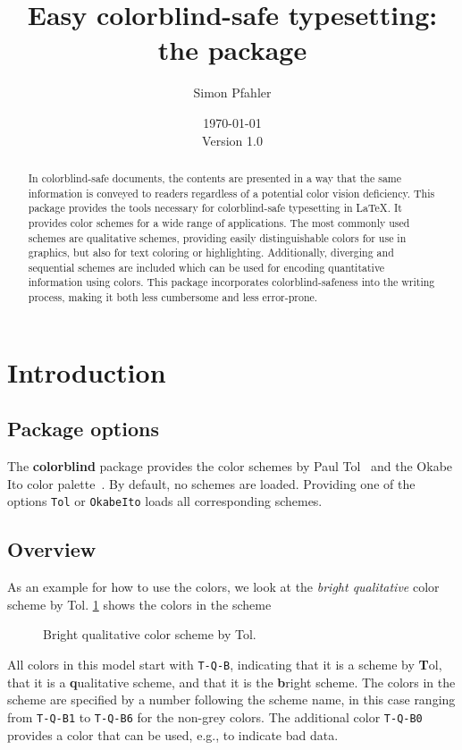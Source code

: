 \documentclass{scrartcl}
\title{Easy colorblind-safe typesetting:\\ the \colorblind package}
\author{Simon Pfahler}
\date{\today\\Version 1.0}
\newcommand\colorblind{\textbf{colorblind} }
\newcommand\marg[1]{\leavevmode\marginpar{\raggedleft #1}}
\begin{document}
\maketitle

\begin{abstract}
    In colorblind-safe documents, the contents are presented in a way that the same information is conveyed to readers regardless of a potential color vision deficiency.
    This package provides the tools necessary for colorblind-safe typesetting in \LaTeX.
    It provides color schemes for a wide range of applications.
    The most commonly used schemes are qualitative schemes, providing easily distinguishable colors for use in graphics, but also for text coloring or highlighting.
    Additionally, diverging and sequential schemes are included which can be used for encoding quantitative information using colors.
    This package incorporates colorblind-safeness into the writing process, making it both less cumbersome and less error-prone.
\end{abstract}

\tableofcontents
\clearpage

\section{Introduction}
\subsection{Package options}
\cprotect\marg{\verb!Tol!\\\verb!OkabeIto!}%
The \colorblind package provides the color schemes by Paul Tol~\cite{Tol} and the Okabe Ito color palette~\cite{Ichihara_2008}.
By default, no schemes are loaded.
Providing one of the options \verb!Tol! or \verb!OkabeIto! loads all corresponding schemes.

\subsection{Overview}
As an example for how to use the colors, we look at the \emph{bright qualitative} color scheme by Tol.
\cref{fig:T-Q-Bexample} shows the colors in the scheme

\begin{figure}[ht]
    \centering
    \caption{Bright qualitative color scheme by Tol.}
    \label{fig:T-Q-Bexample}
\end{figure}

All colors in this model start with \verb!T-Q-B!, indicating that it is a scheme by \textbf{T}ol, that it is a \textbf{q}ualitative scheme, and that it is the \textbf{b}right scheme.
The colors in the scheme are specified by a number following the scheme name, in this case ranging from \verb!T-Q-B1! to \verb!T-Q-B6! for the non-grey colors.
The additional color \verb!T-Q-B0! provides a color that can be used, e.g., to indicate bad data.
\end{document}
